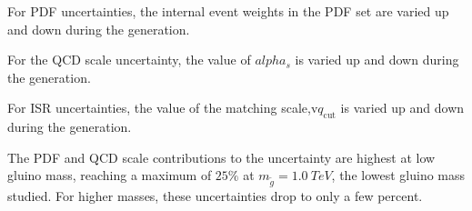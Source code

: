 For PDF uncertainties, the internal event weights in the PDF set are varied up and down during the generation.

For the QCD scale uncertainty, the value of $alpha_s$ is varied up and down during the generation.

For ISR uncertainties, the value of the matching scale,v$q_{\textrm{cut}}$ is varied up and down during the generation.

The PDF and QCD scale contributions to the uncertainty are highest at low gluino mass, reaching a maximum of $25\%$ at
$m_{\tilde{g}}=1.0~TeV$, the lowest gluino mass studied.
For higher masses, these uncertainties drop to only a few percent.

